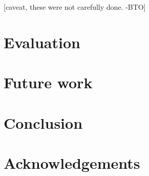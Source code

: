 \documentclass[11pt]{article}
\newcommand{\bocomment}[1]{\textcolor{Bittersweet}{[#1 -BTO]}}
\begin{document}
\bocomment{caveat, these were not carefully done.}


\section{Evaluation}
\label{s:datasplits}

\section{Future work}

\section{Conclusion}

\nocite{flanigan-etal:ACL2014}



\section*{Acknowledgements}



\end{document}

